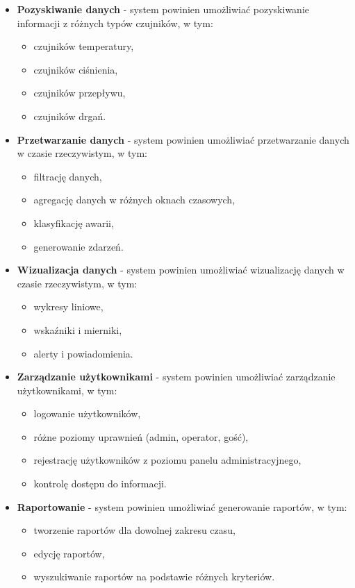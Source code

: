 \begin{itemize}
    \setlength\itemsep{0.5em}
    \item \textbf{Pozyskiwanie danych} - system powinien umożliwiać pozyskiwanie informacji z różnych typów czujników, w tym:
   \begin{itemize}
       \item czujników temperatury,
       \item czujników ciśnienia,
       \item czujników przepływu,
       \item czujników drgań.
   \end{itemize}
    
    \item \textbf{Przetwarzanie danych} - system powinien umożliwiać przetwarzanie danych w czasie rzeczywistym, w tym:
    \begin{itemize}
        \item filtrację danych,
        \item agregację danych w różnych oknach czasowych,
        \item klasyfikację awarii,
        \item generowanie zdarzeń.
    \end{itemize}
    
    \item \textbf{Wizualizacja danych} - system powinien umożliwiać wizualizację danych w czasie rzeczywistym, w tym:
    \begin{itemize}
        \item wykresy liniowe,
        \item wskaźniki i mierniki,
        \item alerty i powiadomienia.
    \end{itemize}
    
   \item \textbf{Zarządzanie użytkownikami} - system powinien umożliwiać zarządzanie użytkownikami, w tym:
   \begin{itemize}
       \item logowanie użytkowników,
       \item różne poziomy uprawnień (admin, operator, gość),
       \item rejestrację użytkowników z poziomu panelu administracyjnego,
       \item kontrolę dostępu do informacji.
   \end{itemize}
    
    \item \textbf{Raportowanie} - system powinien umożliwiać generowanie raportów, w tym:
   \begin{itemize}
       \item tworzenie raportów dla dowolnej zakresu czasu,
       \item edycję raportów,
       \item wyszukiwanie raportów na podstawie różnych kryteriów.
   \end{itemize}
\end{itemize}

